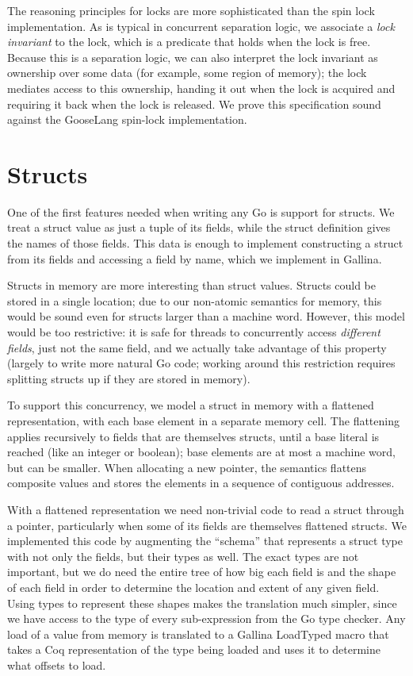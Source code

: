 The reasoning principles for locks are more sophisticated than the spin
lock implementation. As is typical in concurrent separation logic, we
associate a \emph{lock invariant} to the lock, which is a predicate that
holds when the lock is free. Because this is a separation logic, we can
also interpret the lock invariant as ownership over some data (for
example, some region of memory); the lock mediates access to this
ownership, handing it out when the lock is acquired and requiring it
back when the lock is released. We prove this specification sound
against the GooseLang spin-lock implementation.

\section{Structs}

One of the first features needed when writing any Go is support for
structs. We treat a struct value as just a tuple of its fields, while
the struct definition gives the names of those fields. This data is
enough to implement constructing a struct from its fields and accessing
a field by name, which we implement in Gallina.

Structs in memory are more interesting than struct values. Structs could
be stored in a single location; due to our non-atomic semantics for
memory, this would be sound even for structs larger than a machine word.
However, this model would be too restrictive: it is safe for threads to
concurrently access \emph{different fields}, just not the same field,
and we actually take advantage of this property (largely to write more
natural Go code; working around this restriction requires splitting
structs up if they are stored in memory).

To support this concurrency, we model a struct in memory with a
flattened representation, with each base element in a separate memory
cell. The flattening applies recursively to fields that are themselves
structs, until a base literal is reached (like an integer or boolean);
base elements are at most a machine word, but can be smaller. When
allocating a new pointer, the semantics flattens composite values and
stores the elements in a sequence of contiguous addresses.

With a flattened representation we need non-trivial code to read a
struct through a pointer, particularly when some of its fields are
themselves flattened structs. We implemented this code by augmenting the
``schema'' that represents a struct type with not only the fields, but
their types as well. The exact types are not important, but we do need
the entire tree of how big each field is and the shape of each field in
order to determine the location and extent of any given field. Using
types to represent these shapes makes the translation much simpler,
since we have access to the type of every sub-expression from the Go
type checker. Any load of a value from memory is translated to a Gallina
LoadTyped macro that takes a Coq representation of the type being loaded
and uses it to determine what offsets to load.

